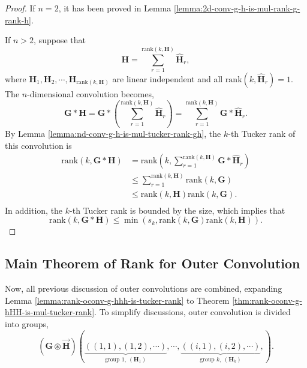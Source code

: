 \documentclass[twoside,11pt]{article}
\def\oconv{\circledast}
\def\rank{\text{rank}}
\def\tvar#1{\mathbf{#1}} %
\def\tvarhat#1{\widehat{\mathbf{#1}}} %
\def\vsymb#1{\vec{\mathbf{#1}}}
\begin{document}
\begin{proof}
  
    If \(n = 2\), it has been proved in Lemma \ref{lemma:2d-conv-g-h-is-mul-rank-g-rank-h}.
  

  
  If \(n > 2\), suppose that
  \begin{equation*}
    \tvar{H} = \sum_{r=1}^{\rank(k, \tvar{H})} \tvarhat{H}_r,
  \end{equation*}
  where \(\tvar{H}_1, \tvar{H}_2, \cdots, \tvar{H}_{\rank(k, \tvar{H})}\) are linear independent and all \(\rank(k, \tvarhat{H}_r) = 1\).
  The \(n\)-dimensional convolution becomes,
  \begin{equation*}
    \tvar{G} * \tvar{H}
    = \tvar{G} * \left(\sum_{r=1}^{\rank(k, \tvar{H})} \tvarhat{H}_r\right)
    = \sum_{r=1}^{\rank(k, \tvar{H})} \tvar{G} * \tvarhat{H}_r.
  \end{equation*}
  By Lemma \ref{lemma:nd-conv-g-h-is-mul-tucker-rank-gh}, the \(k\)-th Tucker rank of this convolution is
  \begin{equation*}
    \begin{aligned}
      \rank\left(k, \tvar{G} * \tvar{H}\right)
       & = \rank\left(k, \sum_{r=1}^{\rank(k, \tvar{H})} \tvar{G} * \tvarhat{H}_r\right) \\
       & \le \sum_{r=1}^{\rank(k, \tvar{H})} \rank\left(k, \tvar{G}\right)               \\
       & \le \rank(k, \tvar{H}) \rank(k, \tvar{G}).                                      \\
    \end{aligned}
  \end{equation*}
  In addition, the \(k\)-th Tucker rank is bounded by the size, which implies that
  \begin{equation*}
    \rank(k, \tvar{G} * \tvar{H}) \le \min(s_k, \rank(k,\tvar{G}) \rank(k,\tvar{H})).
  \end{equation*}
  
\end{proof}

\subsection{Main Theorem of Rank for Outer Convolution}
\label{subsec:main-theorem-of-rank-for-outer-convolution}

Now, all previous discussion of outer convolutions are combined, expanding Lemma \ref{lemma:rank-oconv-g-hhh-is-tucker-rank} to Theorem \ref{thm:rank-oconv-g-hHH-is-mul-tucker-rank}.
To simplify discussions, outer convolution is divided into groups,
\begin{equation*}
  (\tvar{G} \oconv \vsymb{H})\left(
  \underbrace{((1,1), (1,2), \cdots)}_{\text{group } 1, ~ (\tvar{H}_1)},
  \cdots,
  \underbrace{((i,1), (i,2), \cdots)}_{\text{group } k, ~ (\tvar{H}_k)},
  \right).
\end{equation*}
\end{document}
